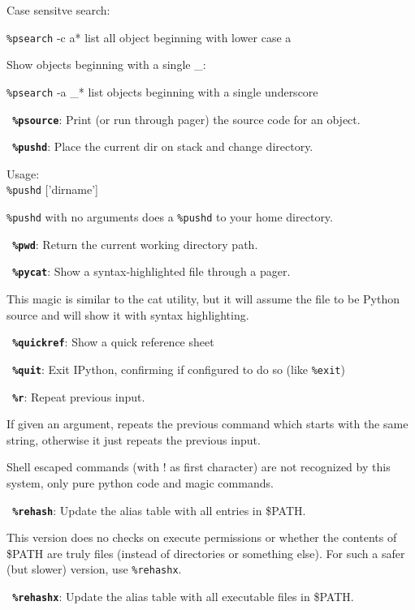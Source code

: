         Case sensitve search:
       
        \texttt{\%psearch} -c a*         list all object beginning with lower case a

        Show objects beginning with a single \_:
       
        \texttt{\%psearch} -a \_*         list objects beginning with a single underscore

\bigskip
\texttt{\textbf{ \%psource}}:
	Print (or run through pager) the source code for an object.

\bigskip
\texttt{\textbf{ \%pushd}}:
	Place the current dir on stack and change directory.
        
        Usage:\\
          \texttt{\%pushd} ['dirname']

        \texttt{\%pushd} with no arguments does a \texttt{\%pushd} to your home directory.
        

\bigskip
\texttt{\textbf{ \%pwd}}:
	Return the current working directory path.

\bigskip
\texttt{\textbf{ \%pycat}}:
	Show a syntax-highlighted file through a pager.

        This magic is similar to the cat utility, but it will assume the file
        to be Python source and will show it with syntax highlighting. 

\bigskip
\texttt{\textbf{ \%quickref}}:
	 Show a quick reference sheet 

\bigskip
\texttt{\textbf{ \%quit}}:
	Exit IPython, confirming if configured to do so (like \texttt{\%exit})

\bigskip
\texttt{\textbf{ \%r}}:
	Repeat previous input.

        If given an argument, repeats the previous command which starts with
        the same string, otherwise it just repeats the previous input.

        Shell escaped commands (with ! as first character) are not recognized
        by this system, only pure python code and magic commands.
        

\bigskip
\texttt{\textbf{ \%rehash}}:
	Update the alias table with all entries in \$PATH.

        This version does no checks on execute permissions or whether the
        contents of \$PATH are truly files (instead of directories or something
        else).  For such a safer (but slower) version, use \texttt{\%rehashx}.

\bigskip
\texttt{\textbf{ \%rehashx}}:
	Update the alias table with all executable files in \$PATH.


